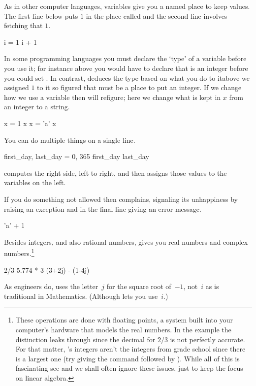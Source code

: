 As in other computer languages, 
variables give you a named place to keep values.
The first line below puts $1$ in the place called 
and the second line involves fetching that $1$.
\begin{pythonconsole}
i = 1
i + 1
\end{pythonconsole}
In some programming languages you must declare the `type' of a variable
before you use it; for instance above you would have to declare 
that  is an integer before you could set .
In contrast, \python{} deduces the type 
based on what you do to it\Dash above we assigned $1$ to it
so \python{} figured that  must be a place to put an integer.
If we change how we use a variable then \python{} will 
refigure; here we change what is kept in $x$ from an integer to a string.
\begin{pythonconsole}
x = 1
x
x = 'a'
x
\end{pythonconsole}

You can do multiple things on a single line.
\begin{pythonconsole}
first_day, last_day = 0, 365
first_day
last_day   
\end{pythonconsole}
\python{} computes the right side, left to right, and then assigns 
those values to the variables on the left.

If you do something not allowed then 
\python{} complains, signaling its unhappiness by 
raising an exception and in the final line giving an error 
message.
\begin{pythonconsole}
'a' + 1
\end{pythonconsole}

Besides integers, and also rational numbers, 
\python{} gives you real numbers and complex numbers.\footnote{%
  These operations
  are done with floating points, a system 
  built into your computer's hardware that
  models the real numbers.
  In the example the distinction leaks through
  since the decimal for $2/3$ is not perfectly accurate.
  For that matter, \protect\python's integers aren't the integers  
  from grade school since there is a largest one 
  (try giving \python{} the 
  command \protect{} followed by 
  \protect{}). 
  While all of this is fascinating\protect\Dash
  see \protect\cite{PythonTeam19a} and \protect\cite{Goldberg91}\protect\Dash
  we shall often ignore these issues, just to keep the focus on 
  linear algebra.}
\begin{pythonconsole}
2/3
5.774 * 3
(3+2j) - (1-4j)
\end{pythonconsole}
As engineers do, \python{} uses the letter~$j$ for the square
root of~$-1$, not~$i$ as is traditional in Mathematics.
(Although \protect\Sage{} lets you use~$i$.)

